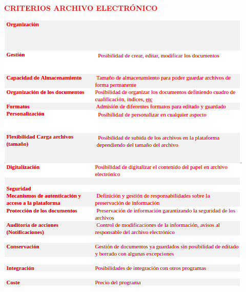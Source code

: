 \documentclass{article}
\begin{document}
\textcolor{Red}{\textbf{CRITERIOS ARCHIVO ELECTRÓNICO}}
\begin{center}
\includegraphics[scale=0.5]{images/earch.png}
\end{center}
\end{document}

